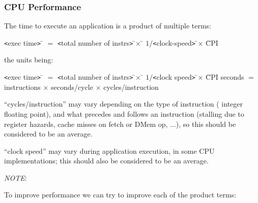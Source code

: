 \begin{frame}[fragile]
\frametitle{CPU Performance}

\footnotesize

The time to execute an application is a product of multiple terms:

\begin{tabbing}
\hmmmm
\= {\tt <}exec time{\tt>}
\= $=$                   
\= {\tt <}total number of instrs{\tt >}
\= \hm $\times$ \hm
\= $1/${\tt <}clock-speed{\tt >}
\= \hm $\times$ \hm
\= CPI
\end{tabbing}

the units being:

\begin{tabbing}
\hmmmm
\= {\tt <}exec time{\tt>}
\= $=$                   
\= {\tt <}total number of instrs{\tt >}
\= \hm $\times$ \hm
\= $1/${\tt <}clock speed{\tt >}
\= \hm $\times$ \hm
\= CPI
\kill
\> seconds
\> $=$
\> instructions
\> \hm $\times$ \hm
\> seconds/cycle
\> \hm $\times$ \hm
\> cycles/instruction
\end{tabbing}

{\scriptsize ``cycles/instruction'' may vary depending on the type of
instruction ({\eg} integer {\vs} floating point), and what precedes
and follows an instruction (stalling due to register hazards, cache
misses on fetch or DMem op, ...), so this should be considered to be
an average.

\vx

``clock speed'' may vary during application execution, in some CPU
implementations; this should also be considered to be an average.}

\vx

\emph{NOTE}: \hm
{}

\PAUSE{\vxx}

To improve performance we can try to improve each of the product terms:
\begin{itemize}


\end{itemize}
\end{frame}
